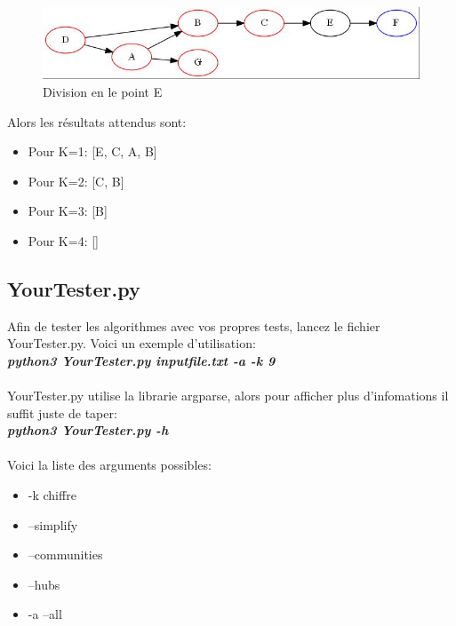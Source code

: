 \documentclass[12pt, oneside]{article}
\begin{document}
\begin{figure}[!h]
    \centering
    \includegraphics[scale=0.7,trim=3 3 3 3,clip]{artipointE}
    \caption{Division en le point E}
\end{figure}
\FloatBarrier
Alors les résultats attendus sont:
\begin{itemize}
\item Pour K=1: [E, C, A, B]
\item Pour K=2: [C, B]
\item Pour K=3: [B]
\item Pour K=4: []
\end{itemize}

\subsection{YourTester.py}
Afin de tester les algorithmes avec vos propres tests, lancez le fichier YourTester.py. Voici un exemple d'utilisation:\\
\textbf{\textit{python3 YourTester.py inputfile.txt -a -k 9}}\\\\
YourTester.py utilise la librarie argparse, alors pour afficher plus d'infomations il suffit juste de taper:\\
\textbf{\textit{python3 YourTester.py -h}}\\\\
Voici la liste des arguments possibles:
\begin{itemize}
\item -k chiffre
\item --simplify 
\item --communities
\item --hubs
\item -a --all
\end{itemize}
\end{document}
